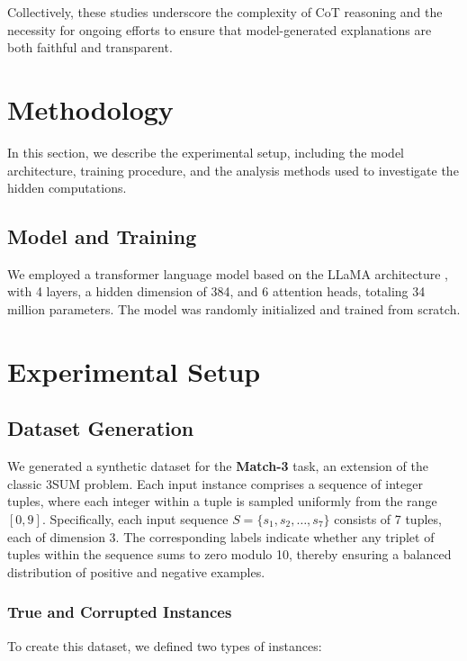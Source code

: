 \documentclass{article}
\begin{document}
Collectively, these studies underscore the complexity of CoT reasoning and the necessity for ongoing efforts to ensure that model-generated explanations are both faithful and transparent.

\section{Methodology}

In this section, we describe the experimental setup, including the model architecture, training procedure, and the analysis methods used to investigate the hidden computations.

\subsection{Model and Training}

We employed a transformer language model based on the LLaMA architecture \cite{touvron2023llama}, with 4 layers, a hidden dimension of 384, and 6 attention heads, totaling 34 million parameters. The model was randomly initialized and trained from scratch.

\newpage
\section{Experimental Setup}

\subsection{Dataset Generation}

We generated a synthetic dataset for the \textbf{Match-3} task, an extension of the classic 3SUM problem. Each input instance comprises a sequence of integer tuples, where each integer within a tuple is sampled uniformly from the range $[0, 9]$. Specifically, each input sequence \( S = \{s_1, s_2, \dots, s_7\} \) consists of 7 tuples, each of dimension 3. The corresponding labels indicate whether any triplet of tuples within the sequence sums to zero modulo 10, thereby ensuring a balanced distribution of positive and negative examples.

\subsubsection{True and Corrupted Instances}

To create this dataset, we defined two types of instances:
\end{document}
